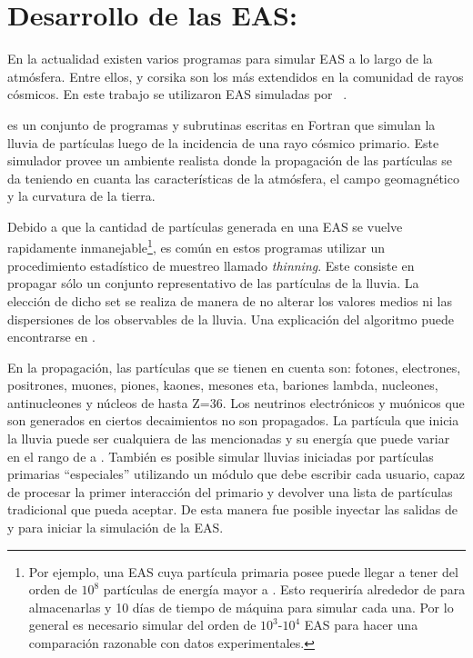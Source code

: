 	\section{Desarrollo de las EAS: \aires{}}

	En la actualidad existen varios programas para simular EAS a lo largo de la atmósfera.
	Entre ellos, \aires{} y {\sc corsika} son los m\'as extendidos en la comunidad de rayos c\'osmicos.
	En este trabajo se utilizaron EAS simuladas por \aires{}~\cite{cite:aires}.

	\aires{} es un conjunto de programas y subrutinas escritas en Fortran que simulan la lluvia de partículas luego de la incidencia de una rayo cósmico primario.
	Este simulador provee un ambiente realista donde la propagación de las partículas se da teniendo en cuanta las características de la atmósfera, el campo geomagnético y la curvatura de la tierra. 
	
	Debido a que la cantidad de part\'iculas generada en una EAS se vuelve rapidamente inmanejable\footnote{Por ejemplo, una EAS cuya part\'icula primaria posee  puede llegar a tener del orden de $10^8$ part\'iculas de energ\'ia mayor a . Esto requerir\'ia alrededor de  para almacenarlas y 10 d\'ias de tiempo de m\'aquina para simular cada una. Por lo general es necesario simular del orden de $10^3\textit{-}10^4$ EAS para hacer una comparaci\'on razonable con datos experimentales.}, es com\'un en estos programas utilizar un procedimiento estadístico de muestreo llamado {\em thinning}.
	Este consiste en propagar s\'olo un conjunto representativo de las part\'iculas de la lluvia.
	La elecci\'on de dicho set se realiza de manera de no alterar los valores medios ni las dispersiones de los observables de la lluvia.
	Una explicaci\'on del algoritmo puede encontrarse en \cite{thining}.

	En la propagaci\'on, las partículas que se tienen en cuenta son: fotones, electrones, positrones, muones, piones, kaones, mesones eta, bariones lambda, nucleones, antinucleones y núcleos de hasta Z=36.
	Los neutrinos electr\'onicos y mu\'onicos que son generados en ciertos decaimientos no son propagados.
	La part\'icula que inicia la lluvia puede ser cualquiera de las mencionadas y su energía que puede variar en el rango de  a . 
	Tambi\'en es posible simular lluvias iniciadas por partículas primarias ``especiales'' utilizando un módulo que debe escribir cada usuario, capaz de procesar la primer interacción del primario y devolver una lista de part\'iculas tradicional que \aires{} pueda aceptar.
	De esta manera fue posible inyectar las salidas de \herwig{} y \tauola{} para iniciar la simulaci\'on de la EAS.

